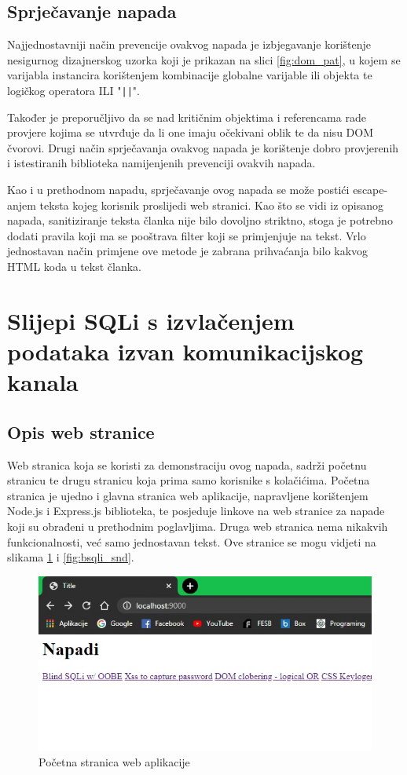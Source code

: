 \documentclass[12pt, oneside, onecolumn]{book}
\begin{document}
{\subsection{Sprječavanje napada}
Najjednostavniji način prevencije ovakvog napada je izbjegavanje korištenje nesigurnog dizajnerskog uzorka koji je prikazan na slici \ref{fig:dom_pat}, u kojem se varijabla instancira korištenjem kombinacije globalne varijable ili objekta te logičkog operatora ILI "\texttt{||}".

Također je preporučljivo da se nad kritičnim objektima i referencama rade provjere kojima se utvrđuje da li one imaju očekivani oblik te da nisu DOM čvorovi. Drugi način sprječavanja ovakvog napada je korištenje dobro provjerenih i istestiranih biblioteka namijenjenih prevenciji ovakvih napada.

Kao i u prethodnom napadu, sprječavanje ovog napada se može postići escape-anjem teksta kojeg korisnik proslijedi web stranici. Kao što se vidi iz opisanog napada, sanitiziranje teksta članka nije bilo dovoljno striktno, stoga je potrebno dodati pravila koji ma se pooštrava filter koji se primjenjuje na tekst. Vrlo jednostavan način primjene ove metode je zabrana prihvaćanja bilo kakvog HTML koda u tekst članka.

\section{Slijepi SQLi s izvlačenjem podataka izvan komunikacijskog kanala} \label{sqli}
\subsection{Opis web stranice}
Web stranica koja se koristi za demonstraciju ovog napada, sadrži početnu stranicu te  drugu stranicu koja prima samo korisnike s kolačićima. Početna stranica je ujedno i glavna stranica web aplikacije, napravljene korištenjem Node.js i Express.js biblioteka, te posjeduje linkove na web stranice za napade koji su obrađeni u prethodnim poglavljima. Druga web stranica nema nikakvih funkcionalnosti, već samo jednostavan tekst. Ove stranice se mogu vidjeti na slikama \ref{fig:bsqli_main} i \ref{fig:bsqli_snd}.

\begin{figure}[H]
	\begin{center}
		\includegraphics[width=\textwidth]{bsqli_main.jpg}
		\caption{Početna stranica web aplikacije} \label{fig:bsqli_main}
	\end{center}
\end{figure}

}
\end{document}
